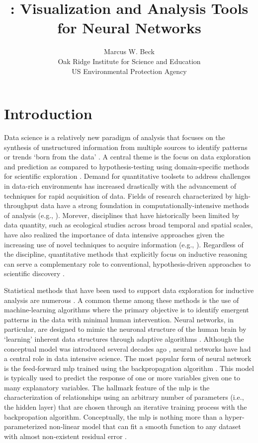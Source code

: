 \documentclass[article,shortnames]{jss}\usepackage[]{graphicx}\usepackage[]{color}
\author{Marcus W. Beck\\Oak Ridge Institute for Science and Education\\US Environmental Protection Agency}
\title{\pkg{NeuralNetTools}: Visualization and Analysis Tools for Neural Networks}
\begin{document}

\section[Introduction]{Introduction}

Data science is a relatively new paradigm of analysis that focuses on the synthesis of unstructured information from multiple sources to identify patterns or trends `born from the data' \citep{Kelling09}.  A central theme is the focus on data exploration and prediction as compared to hypothesis-testing using domain-specific methods for scientific exploration \citep{Kell03}.  Demand for quantitative toolsets to address challenges in data-rich environments has increased drastically with the advancement of techniques for rapid acquisition of data. Fields of research characterized by high-throughput data have a strong foundation in computationally-intensive methods of analysis (e.g., \citet{Saeys07}).  Morever, disciplines that have historically been limited by data quantity, such as ecological studies across broad temporal and spatial scales, have also realized the importance of data intensive approaches given the increasing use of novel techniques to acquire information (e.g., \citet{Swanson15}).  Regardless of the discipline, quantitative methods that explicitly focus on inductive reasoning can serve a complementary role to conventional, hypothesis-driven approaches to scientific discovery \citep{Kell03}.  

Statistical methods that have been used to support data exploration for inductive analysis are numerous \citep{Jain00}.  A common theme among these methods is the use of machine-learning algorithms where the primary objective is to identify emergent patterns in the data with minimal human intervention.  Neural networks, in particular, are designed to mimic the neuronal structure of the human brain by `learning' inherent data structures through adaptive algorithms \citep{Rumelhart86,Ripley96}.  Although the conceptual model was introduced several decades ago \citep{McCulloch43}, neural networks have had a central role in data intensive science.  The most popular form of neural network is the feed-forward \ac{mlp} trained using the backpropagation algorithm \citep{Rumelhart86}.  This model is typically used to predict the response of one or more variables given one to many explanatory variables.  The hallmark feature of the \ac{mlp} is the characterization of relationships using an arbitrary number of parameters (i.e., the hidden layer) that are chosen through an iterative training process with the backpropation algorithm.  Conceptually, the \ac{mlp} is nothing more than a hyper-parameterized non-linear model that can fit a smooth function to any dataset with almost non-existent residual error \citep{Hornik91}.
\end{document}
